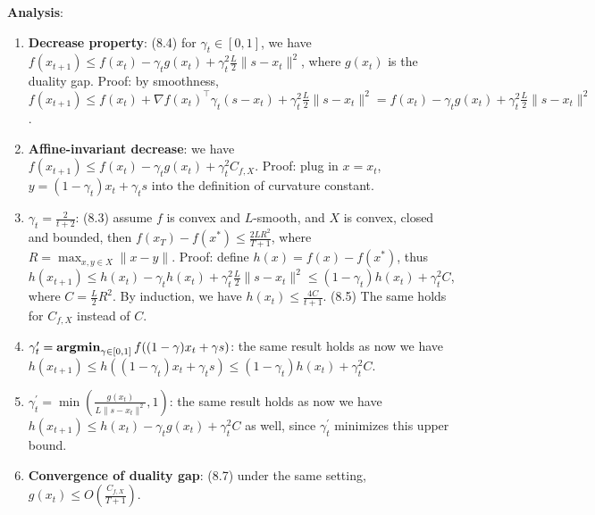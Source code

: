 \textbf{Analysis}:
\begin{enumerate}
    \item \textbf{Decrease property}: (8.4) for $\gamma_t \in [0,1]$, we have $f(x_{t+1}) \le f(x_t) - \gamma_t g(x_t) + \gamma_t^2 \frac{L}{2}\|s-x_t\|^2$, where $g(x_t)$ is the duality gap. Proof: by smoothness, $f(x_{t+1}) \le f(x_t) + \nabla f(x_t)^\top \gamma_t(s-x_t) + \gamma_t^2 \frac{L}{2}\|s-x_t\|^2 = f(x_t) - \gamma_t g(x_t) + \gamma_t^2 \frac{L}{2}\|s-x_t\|^2$.
    \item \textbf{Affine-invariant decrease}: we have $f(x_{t+1}) \le f(x_t) - \gamma_t g(x_t) + \gamma_t^2 C_{f,X}$. Proof: plug in $x=x_t$, $y=(1-\gamma_t)x_t+\gamma_t s$ into the definition of curvature constant.
    \item $\gamma_t = \frac{2}{t+2}$: (8.3) assume $f$ is convex and $L$-smooth, and $X$ is convex, closed and bounded, then $f(x_T) - f(x^*) \le \frac{2LR^2}{T+1}$, where $R = \max_{x,y\in X}\|x-y\|$. Proof: define $h(x) = f(x) - f(x^*)$, thus $h(x_{t+1}) \le h(x_t) - \gamma_t h(x_t) + \gamma_t^2 \frac{L}{2}\|s-x_t\|^2 \le (1-\gamma_t)h(x_t) + \gamma_t^2 C$, where $C = \frac{L}{2}R^2$. By induction, we have $h(x_t) \le \frac{4C}{t+1}$. (8.5) The same holds for $C_{f,X}$ instead of $C$.
    \item $\gamma_t^\prime = \operatorname{\textbf{argmin}}_{\gamma \in [0,1]} f((1-\gamma)x_t + \gamma s)$: the same result holds as now we have $h(x_{t+1}) \le h((1-\gamma_t)x_t + \gamma_t s) \le (1-\gamma_t)h(x_t) + \gamma_t^2 C$.
    \item $\gamma_t^\prime = \min(\frac{g(x_t)}{L\|s-x_t\|^2}, 1)$: the same result holds as now we have $h(x_{t+1}) \le h(x_t) - \gamma_t g(x_t) + \gamma_t^2 C$ as well, since $\gamma_t^\prime$ minimizes this upper bound.
    \item \textbf{Convergence of duality gap}: (8.7) under the same setting, $g(x_t) \le O(\frac{C_{f,X}}{T+1})$.
\end{enumerate}